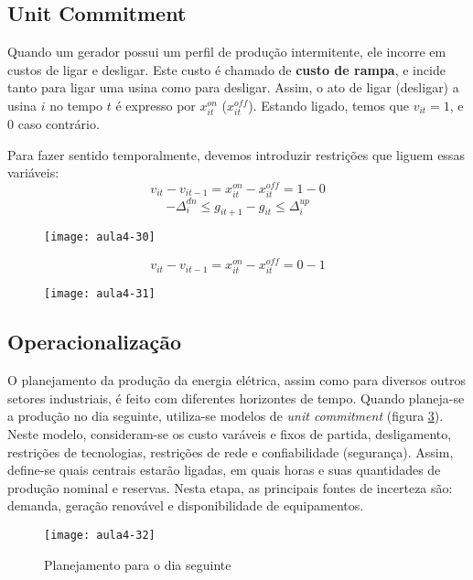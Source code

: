 
\subsection{Unit Commitment}

Quando um gerador possui um perfil de produção intermitente, ele incorre em custos de ligar e desligar. Este custo é chamado de \textbf{custo de rampa}, e incide tanto para ligar uma usina como para desligar. Assim, o ato de ligar (desligar) a usina $i$ no tempo $t$ é expresso por $x_{it}^{on}$ ($x_{it}^{off}$). Estando ligado, temos que $v_{it} = 1$, e $0$ caso contrário.

Para fazer sentido temporalmente, devemos introduzir restrições que liguem essas variáveis:
\[
v_{it}-v_{it-1}=x_{it}^{on}-x_{it}^{off}=1-0
\]
\[
-\Delta_{i}^{dn}\leq g_{it+1}-g_{it}\leq\Delta_{i}^{up}
\]
\begin{figure}[H]
\begin{centering}
\texttt{[image: aula4-30]}\protect\caption{\label{fig:aula4-30} }
\end{centering}
\end{figure}
 \[
v_{it}-v_{it-1}=x_{it}^{on}-x_{it}^{off}=0-1
\]
\begin{figure}[H]
\begin{centering}
\texttt{[image: aula4-31]}\protect\caption{\label{fig:aula4-31} }
\end{centering}
\end{figure}
\subsection{Operacionalização}

O planejamento da produção da energia elétrica, assim como para diversos outros setores industriais, é feito com diferentes horizontes de tempo.
Quando planeja-se a produção no dia seguinte, utiliza-se modelos de \textit{unit commitment} (figura \ref{fig:aula4-32}). Neste modelo, consideram-se os custo varáveis e fixos de partida, desligamento, restrições de tecnologias, restrições de rede e confiabilidade (segurança). Assim, define-se quais centrais estarão ligadas, em quais horas e suas quantidades de produção nominal e reservas. Nesta etapa, as principais fontes de incerteza são: demanda, geração renovável e disponibilidade de equipamentos.
\begin{figure}[H]
\begin{centering}
\texttt{[image: aula4-32]}\protect\caption{\label{fig:aula4-32} Planejamento para o dia seguinte }
\end{centering}
\end{figure}

